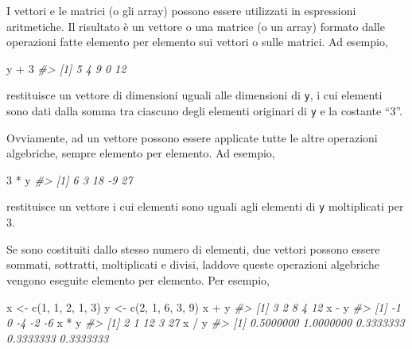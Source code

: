 \documentclass[
]{memoir}
\newenvironment{Shaded}{\begin{snugshade}}{\end{snugshade}}
\newcommand{\CommentTok}[1]{\textcolor[rgb]{0.56,0.35,0.01}{\textit{#1}}}
\newcommand{\DecValTok}[1]{\textcolor[rgb]{0.00,0.00,0.81}{#1}}
\newcommand{\FunctionTok}[1]{\textcolor[rgb]{0.00,0.00,0.00}{#1}}
\newcommand{\NormalTok}[1]{#1}
\newcommand{\OtherTok}[1]{\textcolor[rgb]{0.56,0.35,0.01}{#1}}
\newcommand{\SpecialCharTok}[1]{\textcolor[rgb]{0.00,0.00,0.00}{#1}}
\theoremstyle{definition}
\theoremstyle{definition}
\theoremstyle{definition}
\theoremstyle{definition}
\theoremstyle{remark}
\begin{document}
I vettori e le matrici (o gli array) possono essere utilizzati in
espressioni aritmetiche. Il risultato è un vettore o una matrice (o un
array) formato dalle operazioni fatte elemento per elemento sui vettori
o sulle matrici. Ad esempio,

\begin{Shaded}
\begin{Highlighting}[]
\NormalTok{y }\SpecialCharTok{+} \DecValTok{3}
\CommentTok{\#\textgreater{} [1]  5  4  9  0 12}
\end{Highlighting}
\end{Shaded}

restituisce un vettore di dimensioni uguali alle dimensioni di \texttt{y}, i
cui elementi sono dati dalla somma tra ciascuno degli elementi originari
di \texttt{y} e la costante ``3''.

Ovviamente, ad un vettore possono essere applicate tutte le altre
operazioni algebriche, sempre elemento per elemento. Ad esempio,

\begin{Shaded}
\begin{Highlighting}[]
\DecValTok{3} \SpecialCharTok{*}\NormalTok{ y}
\CommentTok{\#\textgreater{} [1]  6  3 18 {-}9 27}
\end{Highlighting}
\end{Shaded}

restituisce un vettore i cui elementi sono uguali agli elementi di \texttt{y}
moltiplicati per 3.

Se sono costituiti dallo stesso numero di elementi, due vettori possono
essere sommati, sottratti, moltiplicati e divisi, laddove queste
operazioni algebriche vengono eseguite elemento per elemento. Per
esempio,

\begin{Shaded}
\begin{Highlighting}[]
\NormalTok{x }\OtherTok{\textless{}{-}} \FunctionTok{c}\NormalTok{(}\DecValTok{1}\NormalTok{, }\DecValTok{1}\NormalTok{, }\DecValTok{2}\NormalTok{, }\DecValTok{1}\NormalTok{, }\DecValTok{3}\NormalTok{)}
\NormalTok{y }\OtherTok{\textless{}{-}} \FunctionTok{c}\NormalTok{(}\DecValTok{2}\NormalTok{, }\DecValTok{1}\NormalTok{, }\DecValTok{6}\NormalTok{, }\DecValTok{3}\NormalTok{, }\DecValTok{9}\NormalTok{)}
\NormalTok{x }\SpecialCharTok{+}\NormalTok{ y}
\CommentTok{\#\textgreater{} [1]  3  2  8  4 12}
\NormalTok{x }\SpecialCharTok{{-}}\NormalTok{ y}
\CommentTok{\#\textgreater{} [1] {-}1  0 {-}4 {-}2 {-}6}
\NormalTok{x }\SpecialCharTok{*}\NormalTok{ y}
\CommentTok{\#\textgreater{} [1]  2  1 12  3 27}
\NormalTok{x }\SpecialCharTok{/}\NormalTok{ y}
\CommentTok{\#\textgreater{} [1] 0.5000000 1.0000000 0.3333333 0.3333333 0.3333333}
\end{Highlighting}
\end{Shaded}
\end{document}
